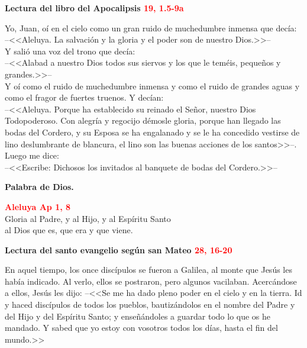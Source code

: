 \documentclass[12pt, letterpaper, spanish]{report}
\begin{document}
\newpage

\Large {\bfseries Lectura del libro del Apocalipsis \hspace{1cm} \textcolor{red}{19, 1.5-9a}} \newline 

\Large Yo, Juan, o\'i en el cielo como un gran ruido de muchedumbre inmensa que dec\'ia: \\
--<<Aleluya. La salvaci\'on y la gloria y el poder son de nuestro Dios.>>-- \\
Y sali\'o una voz del trono que dec\'ia: \\
--<<Alabad a nuestro Dios todos sus siervos y los que le tem\'eis, peque\~nos y grandes.>>-- \\
Y o\'i como el ruido de muchedumbre inmensa y como el ruido de grandes aguas y 
como el fragor de fuertes truenos. Y dec\'ian: \\
--<<Aleluya. Porque ha establecido su reinado el Se\~nor, nuestro Dios \\ Todopoderoso. 
Con alegr\'ia y regocijo d\'emosle gloria, porque han llegado las bodas del Cordero, 
y su Esposa se ha engalanado y se le ha concedido vestirse de lino deslumbrante de blancura, el 
lino son las buenas acciones de los santos>>--. \\
Luego me dice: \\
--<<Escribe: Dichosos los invitados al banquete de bodas del Cordero.>>-- \newline

{\bfseries Palabra de Dios.} \newline

\begin{center} 
\Large {\bfseries \textcolor{red}{Aleluya \hspace{1cm} Ap 1, 8}} \\
Gloria al Padre, y al Hijo, y al Esp\'iritu Santo \\
al Dios que es, que era y que viene.
\end{center}

\newpage

\Huge \textcolor{red}{} \Large {\bfseries Lectura del santo evangelio seg\'un san Mateo \hspace{1cm} \textcolor{red}{28, 16-20}} \newline

\Large En aquel tiempo, los once disc\'ipulos se fueron a Galilea, al monte que Jes\'us les 
hab\'ia indicado. \hfill \break
Al verlo, ellos se postraron, pero algunos vacilaban. \newline
Acerc\'andose a ellos, Jes\'us les dijo: \newline
--<<Se me ha dado pleno poder en el cielo y en la tierra. \newline
Id y haced disc\'ipulos de todos los pueblos, bautiz\'andolos en el nombre del Padre y del Hijo y 
del Esp\'iritu Santo; y ense\~n\'andoles a guardar todo lo que os he mandado. \newline
Y sabed que yo estoy con vosotros todos los d\'ias, hasta el fin del mundo.>> \newline
\end{document}
